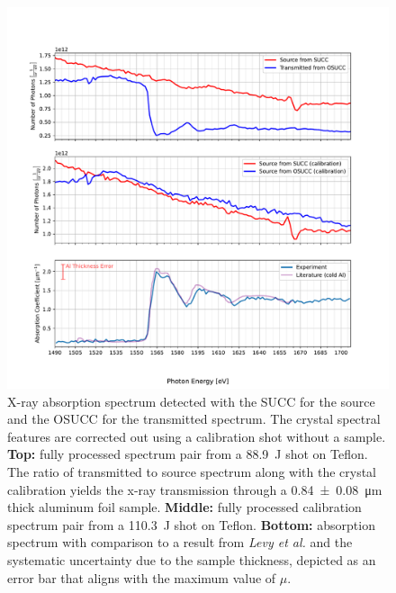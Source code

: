 \begin{figure}[!htbp]
	\centering
	\includegraphics[width=\textwidth]{Data_Analysis/absorption/absorption_spectrum_of_PTFE_event_72_on_OSUCC.pdf}
	\caption{X-ray absorption spectrum detected with the SUCC for the source and the OSUCC for the transmitted spectrum. The crystal spectral features are corrected out using a calibration shot without a sample. \textbf{Top:} fully processed spectrum pair from a \SI{88.9}{\joule} shot on Teflon. The ratio of transmitted to source spectrum along with the crystal calibration yields the x-ray transmission through a \SI{0.84\pm0.08}{\micro\meter} thick aluminum foil sample. \textbf{Middle:} fully processed calibration spectrum pair from a \SI{110.3}{\joule} shot on Teflon. \textbf{Bottom:} absorption spectrum with comparison to a result from \textit{Levy et al.} \citep{levy2010double} and the systematic uncertainty due to the sample thickness, depicted as an error bar that aligns with the maximum value of $\mu$.}
	\label{fig: SUCC absorption}
\end{figure}

